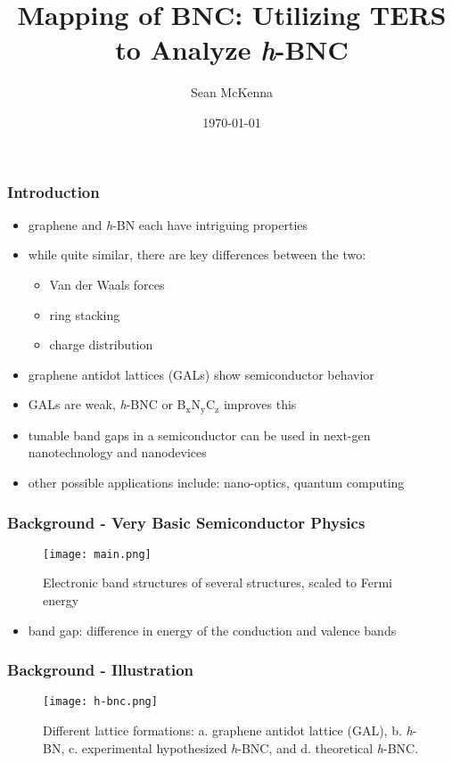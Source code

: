 \documentclass{beamer}
\title{Mapping of B\sub{x}N\sub{y}C\sub{z}: Utilizing TERS to Analyze \textit{h}-BNC}
\author{Sean McKenna}
\institute[Cornell College]{ Cornell College \\ \medskip {\emph{smckenna12@cornellcollege.edu}} }
\date{\today}
\newcommand{\sub}[1]{\ensuremath{_{\textrm{#1}}}}
\begin{document}
\begin{frame}
  \titlepage
\end{frame}

\begin{frame}
  \frametitle{Introduction}
  \begin{itemize}
    \item graphene and \textit{h}-BN each have intriguing properties\cite{main,bn}
    \item while quite similar, there are key differences between the two:
    \begin{itemize}
      \item Van der Waals forces
      \item ring stacking
      \item charge distribution
    \end{itemize}
    \item graphene antidot lattices (GALs) show semiconductor behavior\cite{qubit}
    \item GALs are weak, \textit{h}-BNC or B\sub{x}N\sub{y}C\sub{z} improves this\cite{main}
    \item tunable band gaps in a semiconductor can be used in next-gen nanotechnology and nanodevices
    \item other possible applications include: nano-optics, quantum computing
  \end{itemize}
\end{frame}

\begin{frame}
  \frametitle{Background - Very Basic Semiconductor Physics}
  \begin{figure}
    \texttt{[image: main.png]}
    \caption{Electronic band structures of several structures, scaled to Fermi energy\cite{main}}
  \end{figure}
  \begin{itemize}
    \item band gap: difference in energy of the conduction and valence bands
  \end{itemize}
\end{frame}

\begin{frame}
  \frametitle{Background - Illustration}
  \begin{figure}
    \texttt{[image: h-bnc.png]}
    \caption{Different lattice formations: a. graphene antidot lattice (GAL),\cite{qubit} b. \textit{h}-BN,\cite{bn} c. experimental hypothesized \textit{h}-BNC,\cite{synth} and d. theoretical \textit{h}-BNC.\cite{main}}
  \end{figure}
\end{frame}
\end{document}
